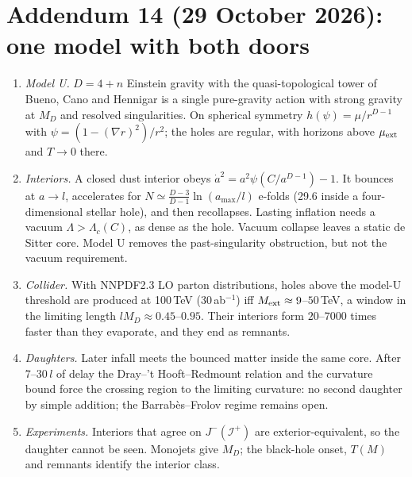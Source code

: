 \documentclass[11pt,a4paper]{article}
\theoremstyle{remark}\newtheorem{remark}[theorem]{Remark}
\begin{document}
\section*{Addendum 14 (29 October 2026): one model with both doors}
\begin{enumerate}
\item \emph{Model U.} $D=4+n$ Einstein gravity with the quasi-topological tower of Bueno, Cano and Hennigar is a single pure-gravity action
with strong gravity at $M_D$ and resolved singularities. On spherical symmetry $h(\psi)=\mu/r^{D-1}$ with $\psi=(1-(\nabla r)^2)/r^2$; the
holes are regular, with horizons above $\mu_{\rm ext}$ and $T\to0$ there.
\item \emph{Interiors.} A closed dust interior obeys $\dot a^2=a^2\psi(C/a^{D-1})-1$. It bounces at $a\to l$, accelerates for
$N\simeq\frac{D-3}{D-1}\ln(a_{\max}/l)$ e-folds (29.6 inside a four-dimensional stellar hole), and then recollapses. Lasting inflation needs a
vacuum $\Lambda>\Lambda_c(C)$, as dense as the hole. Vacuum collapse leaves a static de Sitter core. Model U removes the past-singularity
obstruction, but not the vacuum requirement.
\item \emph{Collider.} With NNPDF2.3 LO parton distributions, holes above the model-U threshold are produced at 100\,TeV (30\,ab$^{-1}$)
iff $M_{\rm ext}\approx9$--$50$\,TeV, a window in the limiting length $lM_D\approx0.45$--$0.95$. Their interiors form $20$--$7000$ times faster
than they evaporate, and they end as remnants.
\item \emph{Daughters.} Later infall meets the bounced matter inside the same core. After 7--30\,$l$ of delay the Dray--'t Hooft--Redmount
relation and the curvature bound force the crossing region to the limiting curvature: no second daughter by simple addition; the
Barrabès--Frolov regime remains open.
\item \emph{Experiments.} Interiors that agree on $J^-(\mathcal I^+)$ are exterior-equivalent, so the daughter cannot be seen. Monojets give
$M_D$; the black-hole onset, $T(M)$ and remnants identify the interior class.
\end{enumerate}
\end{document}
